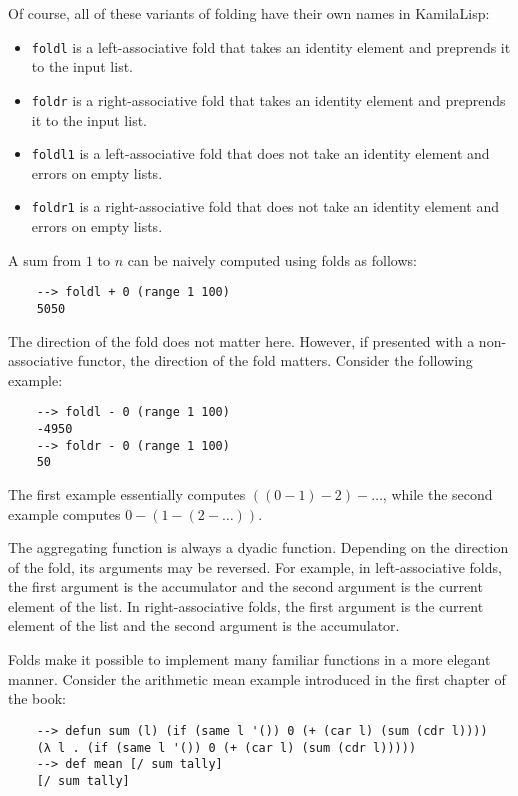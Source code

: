 Of course, all of these variants of folding have their own names in KamilaLisp:

\begin{itemize}
    \item \verb|foldl| is a left-associative fold that takes an identity element and preprends it to the input list.
    \item \verb|foldr| is a right-associative fold that takes an identity element and preprends it to the input list.
    \item \verb|foldl1| is a left-associative fold that does not take an identity element and errors on empty lists.
    \item \verb|foldr1| is a right-associative fold that does not take an identity element and errors on empty lists.
\end{itemize}

A sum from $1$ to $n$ can be naively computed using folds as follows:

\begin{Verbatim}
    --> foldl + 0 (range 1 100)
    5050
\end{Verbatim}

The direction of the fold does not matter here. However, if presented with a non-associative functor, the direction of the fold matters. Consider the following example:

\begin{Verbatim}
    --> foldl - 0 (range 1 100)
    -4950
    --> foldr - 0 (range 1 100)
    50
\end{Verbatim}

The first example essentially computes $((0 - 1) - 2) - \dots$, while the second example computes $0 - (1 - (2 - \dots))$.

The aggregating function is always a dyadic function. Depending on the direction of the fold, its arguments may be reversed. For example, in left-associative folds, the first argument is the accumulator and the second argument is the current element of the list. In right-associative folds, the first argument is the current element of the list and the second argument is the accumulator.

Folds make it possible to implement many familiar functions in a more elegant manner. Consider the arithmetic mean example introduced in the first chapter of the book:

\begin{Verbatim}
    --> defun sum (l) (if (same l '()) 0 (+ (car l) (sum (cdr l))))
    (λ l . (if (same l '()) 0 (+ (car l) (sum (cdr l)))))
    --> def mean [/ sum tally]
    [/ sum tally]
\end{Verbatim}


